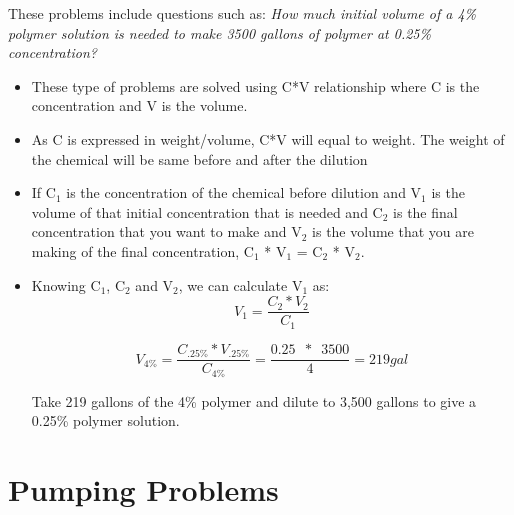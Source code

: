 These problems include questions such as:  \textit{How much initial volume of a 4\% polymer solution is needed to make 3500 gallons of polymer at 0.25\% concentration?}\\
\begin{itemize}
\item These type of problems are solved using C*V relationship where C is the concentration and V is the volume.

\item As C is expressed in weight/volume, C*V will equal to weight.  The weight of the chemical will be same before and after the dilution

\item If C$_1$ is the concentration of the chemical before dilution and V$_1$ is the volume of that initial concentration that is needed and C$_2$ is the final concentration that you want to make and V$_2$ is the volume that you are making of the final concentration, C$_1$ * V$_1$ = C$_2$ * V$_2$.

\item Knowing C$_1$, C$_2$ and V$_2$, we can calculate V$_1$ as: $$V_1 = \dfrac{C_2 * V_2}{C_1}$$

$$V_{4\%} = \dfrac{C_{.25\%} * V_{.25\%}}{C_{4\%}} = \dfrac{0.25 \enspace * \enspace 3500}{4}= 219 gal $$ 

Take 219 gallons of the 4\% polymer and dilute to 3,500 gallons to give a 0.25\% polymer solution.

\end{itemize}

\section{Pumping Problems}

